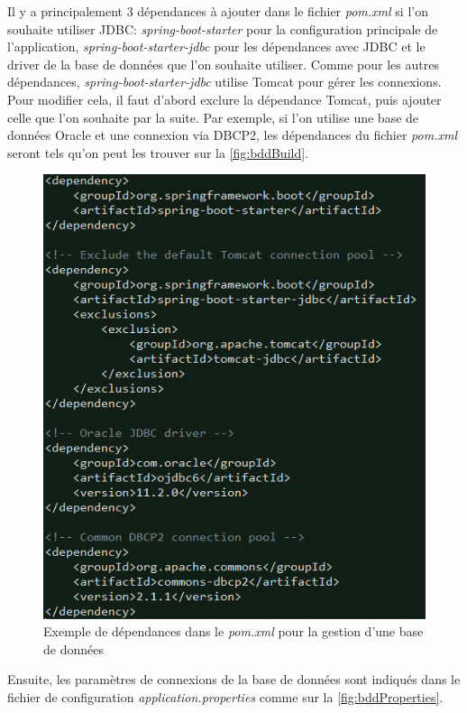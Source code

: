 \documentclass{polytech/polytech}
\begin{document}
Il y a principalement 3 dépendances à ajouter dans le fichier \textit{pom.xml} si l’on souhaite utiliser JDBC: \textit{spring-boot-starter} pour la configuration principale de l’application, \textit{spring-boot-starter-jdbc} pour les dépendances avec JDBC et le driver de la base de données que l’on souhaite utiliser. Comme pour les autres dépendances, \textit{spring-boot-starter-jdbc} utilise Tomcat pour gérer les connexions. Pour modifier cela, il faut d’abord exclure la dépendance Tomcat, puis ajouter celle que l’on souhaite par la suite. Par exemple, si l’on utilise une base de données Oracle et une connexion via DBCP2, les dépendances du fichier \textit{pom.xml} seront tels qu'on peut les trouver sur la \autoref{fig:bddBuild}. 

\begin{figure}
	\includegraphics[scale=0.75]{images/bddPom}
	\caption{Exemple de dépendances dans le \textit{pom.xml} pour la gestion d'une base de données}
	\label{fig:bddBuild}
\end{figure}

Ensuite, les paramètres de connexions de la base de données sont indiqués dans le fichier de configuration \textit{application.properties} comme sur la \autoref{fig:bddProperties}.
\end{document}
